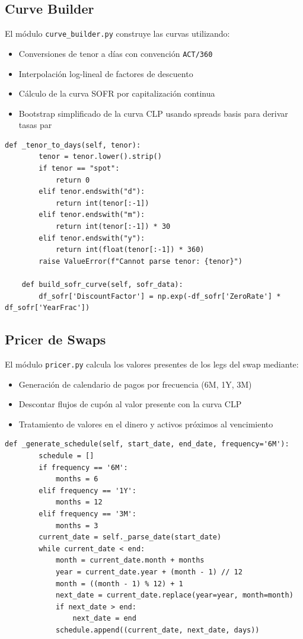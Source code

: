 \subsection*{Curve Builder}
El módulo \texttt{curve_builder.py} construye las curvas utilizando:
\begin{itemize}
    \item Conversiones de tenor a días con convención \texttt{ACT/360}
    \item Interpolación log-lineal de factores de descuento
    \item Cálculo de la curva SOFR por capitalización continua
    \item Bootstrap simplificado de la curva CLP usando spreads basis para derivar tasas par
\end{itemize}

\begin{lstlisting}[caption={Extracción de \texttt{curve_builder.py}}]
    def _tenor_to_days(self, tenor):
        tenor = tenor.lower().strip()
        if tenor == "spot":
            return 0
        elif tenor.endswith("d"):
            return int(tenor[:-1])
        elif tenor.endswith("m"):
            return int(tenor[:-1]) * 30
        elif tenor.endswith("y"):
            return int(float(tenor[:-1]) * 360)
        raise ValueError(f"Cannot parse tenor: {tenor}")

    def build_sofr_curve(self, sofr_data):
        df_sofr['DiscountFactor'] = np.exp(-df_sofr['ZeroRate'] * df_sofr['YearFrac'])
\end{lstlisting}

\subsection*{Pricer de Swaps}
El módulo \texttt{pricer.py} calcula los valores presentes de los legs del swap mediante:
\begin{itemize}
    \item Generación de calendario de pagos por frecuencia (6M, 1Y, 3M)
    \item Descontar flujos de cupón al valor presente con la curva CLP
    \item Tratamiento de valores en el dinero y activos próximos al vencimiento
\end{itemize}

\begin{lstlisting}[caption={Extracción de \texttt{pricer.py}}]
    def _generate_schedule(self, start_date, end_date, frequency='6M'):
        schedule = []
        if frequency == '6M':
            months = 6
        elif frequency == '1Y':
            months = 12
        elif frequency == '3M':
            months = 3
        current_date = self._parse_date(start_date)
        while current_date < end:
            month = current_date.month + months
            year = current_date.year + (month - 1) // 12
            month = ((month - 1) % 12) + 1
            next_date = current_date.replace(year=year, month=month)
            if next_date > end:
                next_date = end
            schedule.append((current_date, next_date, days))
\end{lstlisting}

